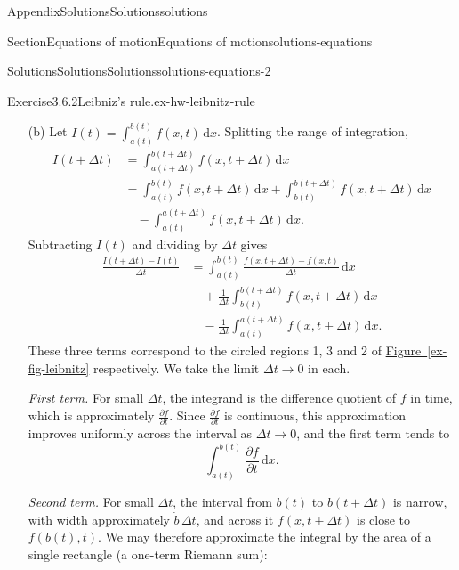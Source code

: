 \documentclass[oneside,10pt,]{book}
\newcommand{\xreffont}{\relax}
\numberwithin{equation}{section}
\newcommand{\de}{\mathrm{d}}
\newcommand{\pd}[2]{\frac{\partial#1}{\partial#2}}
\begin{document}
\begin{appendixptx}{Appendix}{Solutions}{}{Solutions}{}{}{solutions}
\begin{sectionptx}{Section}{Equations of motion}{}{Equations of motion}{}{}{solutions-equations}
\begin{solutions-subsection-numberless}{Solutions}{Solutions}{}{Solutions}{}{}{solutions-equations-2}
\begin{divisionsolution}{Exercise}{3.6.2}{Leibniz's rule.}{ex-hw-leibnitz-rule}
\begin{enumerate}[font=\bfseries,label=(\alph*),ref=\alph*]
\par
The third circled element is associated with%
\begin{equation*}
f(b(t), t + \Delta t)[b(t + \Delta t) - b(t)] \frac{1}{\Delta t}.
\end{equation*}
This is the area of the right-hand (pink) rectangle, which is gained as the upper limit moves to the right. Notice that for small \(\Delta t\), the rectangle height \(f(b,
t+\Delta t)\) is approximately \(f(b, t)\).%
\item[(b)]\noindent\hypertarget{ex-hw-leibnitz-rule-4-3-main}{}Let \(I(t) = \int_{a(t)}^{b(t)} f(x, t) \, \de{x}\). Splitting the range of integration,%
\begin{align*}
I(t + \Delta t) &= \int_{a(t + \Delta t)}^{b(t + \Delta t)} f(x, t + \Delta
t) \, \de{x}\\
&= \int_{a(t)}^{b(t)} f(x, t + \Delta t) \, \de{x} + \int_{b(t)}^{b(t +
\Delta t)} f(x, t + \Delta t) \, \de{x}\\
&\quad - \int_{a(t)}^{a(t + \Delta t)} f(x, t + \Delta t) \, \de{x}.
\end{align*}
Subtracting \(I(t)\) and dividing by \(\Delta t\) gives%
\begin{align*}
\frac{I(t + \Delta t) - I(t)}{\Delta t} &= \int_{a(t)}^{b(t)} \frac{f(x, t
+ \Delta t) - f(x, t)}{\Delta t} \, \de{x}\\
&\quad + \frac{1}{\Delta t}\int_{b(t)}^{b(t + \Delta t)} f(x, t + \Delta t)
\, \de{x}\\
&\quad - \frac{1}{\Delta t}\int_{a(t)}^{a(t + \Delta t)} f(x, t + \Delta t)
\, \de{x}.
\end{align*}
These three terms correspond to the circled regions 1, 3 and 2 of \hyperref[ex-fig-leibnitz]{Figure~{\xreffont\ref{ex-fig-leibnitz}}} respectively. We take the limit \(\Delta t \to 0\) in each.%
\par
\emph{First term.} For small \(\Delta t\), the integrand is the difference quotient of \(f\) in time, which is approximately \(\pd{f}{t}\). Since \(\pd{f}{t}\) is continuous, this approximation improves uniformly across the interval as \(\Delta t
\to 0\), and the first term tends to%
\begin{equation*}
\int_{a(t)}^{b(t)} \pd{f}{t} \, \de{x}.
\end{equation*}
%
\par
\emph{Second term.} For small \(\Delta t\), the interval from \(b(t)\) to \(b(t
+ \Delta t)\) is narrow, with width approximately \(\dot{b}\,\Delta t\), and across it \(f(x, t + \Delta t)\) is close to \(f(b(t), t)\). We may therefore approximate the integral by the area of a single rectangle (a one-term Riemann sum):%

\end{enumerate}
\end{divisionsolution}
\end{solutions-subsection-numberless}
\end{sectionptx}
\end{appendixptx}
\end{document}
